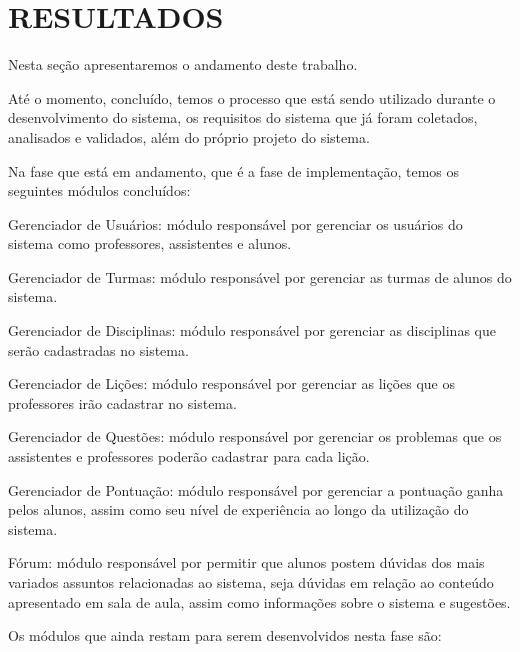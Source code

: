 \chapter{RESULTADOS}
\label{chap:resultados}

Nesta seção apresentaremos o andamento deste trabalho.

Até o momento, concluído, temos o processo que está sendo utilizado durante o desenvolvimento do sistema, os requisitos do sistema que já foram coletados, analisados e validados, além do próprio projeto do sistema. 

Na fase que está em andamento, que é a fase de implementação, temos os seguintes módulos concluídos: 

\begin{alineascomponto}
    \item Gerenciador de Usuários: módulo responsável por gerenciar os usuários do sistema como professores, assistentes e alunos.
    \item Gerenciador de Turmas: módulo responsável por gerenciar as turmas de alunos do sistema.
    \item Gerenciador de Disciplinas: módulo responsável por gerenciar as disciplinas que serão cadastradas no sistema.
    \item Gerenciador de Lições: módulo responsável por gerenciar as lições que os professores irão cadastrar no sistema.
    \item Gerenciador de Questões: módulo responsável por gerenciar os problemas que os assistentes e professores poderão cadastrar para cada lição.
    \item Gerenciador de Pontuação: módulo responsável por gerenciar a pontuação ganha pelos alunos, assim como seu nível de experiência ao longo da utilização do sistema. 
    \item Fórum: módulo responsável por permitir que alunos postem dúvidas dos mais variados  assuntos relacionadas ao sistema, seja dúvidas em relação ao conteúdo apresentado em sala de aula, assim como informações sobre o sistema e sugestões. 
\end{alineascomponto}

Os módulos que ainda restam para serem desenvolvidos nesta fase são:

